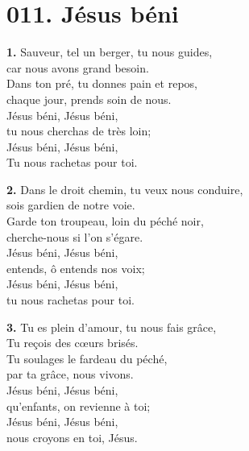 \documentclass[]{article}
\begin{document}
\hypertarget{h011}{}
\section*{011. Jésus béni}
\label{h:011}

\vspace{-0.8em}

\vspace{0.8em}
\medskip
\noindent\textbf{1.} Sauveur, tel un berger, tu nous guides,\\
car nous avons grand besoin.\\
Dans ton pré, tu donnes pain et repos,\\
chaque jour, prends soin de nous.\\
Jésus béni, Jésus béni,\\
tu nous cherchas de très loin;\\
Jésus béni, Jésus béni,\\
Tu nous rachetas pour toi.

\medskip
\noindent\textbf{2.} Dans le droit chemin, tu veux nous conduire,\\
sois gardien de notre voie.\\
Garde ton troupeau, loin du péché noir,\\
cherche-nous si l'on s'égare.\\
Jésus béni, Jésus béni,\\
entends, ô entends nos voix;\\
Jésus béni, Jésus béni,\\
tu nous rachetas pour toi.

\medskip
\noindent\textbf{3.} Tu es plein d'amour, tu nous fais grâce,\\
Tu reçois des cœurs brisés.\\
Tu soulages le fardeau du péché,\\
par ta grâce, nous vivons.\\
Jésus béni, Jésus béni,\\
qu'enfants, on revienne à toi;\\
Jésus béni, Jésus béni,\\
nous croyons en toi, Jésus.
\end{document}
